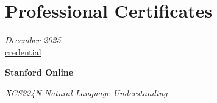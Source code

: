 \section{Professional Certificates}

    \begin{twocolentry}{
    
    \textit{December 2025}\\
\mbox{\href{https://digitalcredential.stanford.edu/check/0A1B9763B9AF3F624A5B77F09AAE2269D7938516385DE431DBF4D7667844CA8EYmVQcjFIZVZSc1lFTDRiVC9DeUlaa1ZOcnRxQVIrMVJFeHR1cTJOY0NNREFVUWJC}{credential}}}
        \textbf{Stanford Online}
        
        \textit{XCS224N Natural Language Understanding}
    
    \end{twocolentry}
